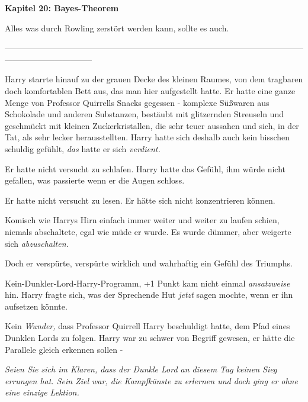 

\hypertarget{bayes-theorem}{%

\textbf{Kapitel 20: Bayes-Theorem\\ }

\hfill\break Alles was durch Rowling zerstört werden kann, sollte es auch.

--------------------------------------------------------------------------------------------------------------------------------------------

\hfill\break Harry starrte hinauf zu der grauen Decke des kleinen Raumes, von dem tragbaren doch komfortablen Bett aus, das man hier aufgestellt hatte. Er hatte eine ganze Menge von Professor Quirrells Snacks gegessen - komplexe Süßwaren aus Schokolade und anderen Substanzen, bestäubt mit glitzernden Streuseln und geschmückt mit kleinen Zuckerkristallen, die sehr teuer aussahen und sich, in der Tat, als sehr lecker herausstellten. Harry hatte sich deshalb auch kein bisschen schuldig gefühlt, \emph{das} hatte er sich \emph{verdient.}

Er hatte nicht versucht zu schlafen. Harry hatte das Gefühl, ihm würde nicht gefallen, was passierte wenn er die Augen schloss.

Er hatte nicht versucht zu lesen. Er hätte sich nicht konzentrieren können.

Komisch wie Harrys Hirn einfach immer weiter und weiter zu laufen schien, niemals abschaltete, egal wie müde er wurde. Es wurde dümmer, aber weigerte sich \emph{abzuschalten.}

Doch er verspürte, verspürte wirklich und wahrhaftig ein Gefühl des Triumphs.

Kein-Dunkler-Lord-Harry-Programm, +1 Punkt kam nicht einmal \emph{ansatzweise} hin. Harry fragte sich, was der Sprechende Hut \emph{jetzt} sagen mochte, wenn er ihn aufsetzen könnte.

Kein \emph{Wunder,} dass Professor Quirrell Harry beschuldigt hatte, dem Pfad eines Dunklen Lords zu folgen. Harry war zu schwer von Begriff gewesen, er hätte die Parallele gleich erkennen sollen -

\emph{Seien Sie sich im Klaren, dass der Dunkle Lord an diesem Tag keinen Sieg errungen hat. Sein Ziel war, die Kampfkünste zu erlernen und doch ging er ohne eine einzige Lektion.}

}
